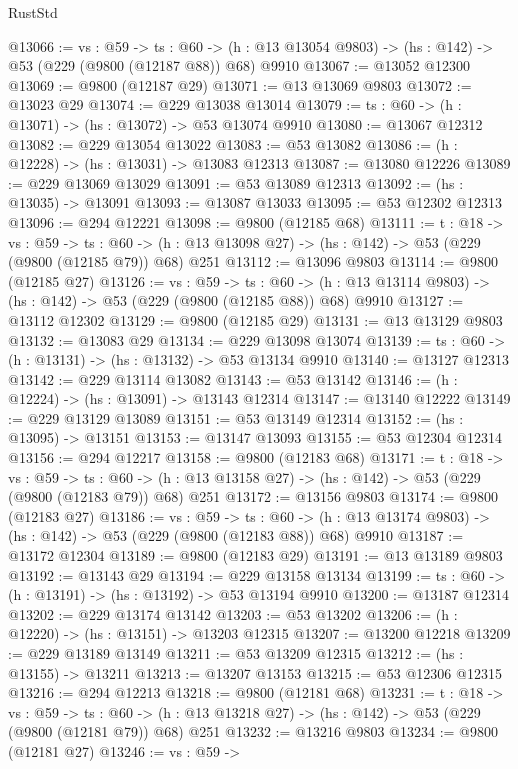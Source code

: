 \begin{lexlean}{RustStd}
\begin{coremodule}
@13066 := {vs : @59} ->
  {ts : @60} -> (h : @13 @13054 @9803) -> (hs : @142) -> @53 (@229 (@9800 (@12187 @88)) @68) @9910
@13067 := @13052 @12300
@13069 := @9800 (@12187 @29)
@13071 := @13 @13069 @9803
@13072 := @13023 @29
@13074 := @229 @13038 @13014
@13079 := {ts : @60} -> (h : @13071) -> (hs : @13072) -> @53 @13074 @9910
@13080 := @13067 @12312
@13082 := @229 @13054 @13022
@13083 := @53 @13082
@13086 := (h : @12228) -> (hs : @13031) -> @13083 @12313
@13087 := @13080 @12226
@13089 := @229 @13069 @13029
@13091 := @53 @13089 @12313
@13092 := (hs : @13035) -> @13091
@13093 := @13087 @13033
@13095 := @53 @12302 @12313
@13096 := @294 @12221
@13098 := @9800 (@12185 @68)
@13111 := {t : @18} ->
  {vs : @59} ->
  {ts : @60} -> (h : @13 @13098 @27) -> (hs : @142) -> @53 (@229 (@9800 (@12185 @79)) @68) @251
@13112 := @13096 @9803
@13114 := @9800 (@12185 @27)
@13126 := {vs : @59} ->
  {ts : @60} -> (h : @13 @13114 @9803) -> (hs : @142) -> @53 (@229 (@9800 (@12185 @88)) @68) @9910
@13127 := @13112 @12302
@13129 := @9800 (@12185 @29)
@13131 := @13 @13129 @9803
@13132 := @13083 @29
@13134 := @229 @13098 @13074
@13139 := {ts : @60} -> (h : @13131) -> (hs : @13132) -> @53 @13134 @9910
@13140 := @13127 @12313
@13142 := @229 @13114 @13082
@13143 := @53 @13142
@13146 := (h : @12224) -> (hs : @13091) -> @13143 @12314
@13147 := @13140 @12222
@13149 := @229 @13129 @13089
@13151 := @53 @13149 @12314
@13152 := (hs : @13095) -> @13151
@13153 := @13147 @13093
@13155 := @53 @12304 @12314
@13156 := @294 @12217
@13158 := @9800 (@12183 @68)
@13171 := {t : @18} ->
  {vs : @59} ->
  {ts : @60} -> (h : @13 @13158 @27) -> (hs : @142) -> @53 (@229 (@9800 (@12183 @79)) @68) @251
@13172 := @13156 @9803
@13174 := @9800 (@12183 @27)
@13186 := {vs : @59} ->
  {ts : @60} -> (h : @13 @13174 @9803) -> (hs : @142) -> @53 (@229 (@9800 (@12183 @88)) @68) @9910
@13187 := @13172 @12304
@13189 := @9800 (@12183 @29)
@13191 := @13 @13189 @9803
@13192 := @13143 @29
@13194 := @229 @13158 @13134
@13199 := {ts : @60} -> (h : @13191) -> (hs : @13192) -> @53 @13194 @9910
@13200 := @13187 @12314
@13202 := @229 @13174 @13142
@13203 := @53 @13202
@13206 := (h : @12220) -> (hs : @13151) -> @13203 @12315
@13207 := @13200 @12218
@13209 := @229 @13189 @13149
@13211 := @53 @13209 @12315
@13212 := (hs : @13155) -> @13211
@13213 := @13207 @13153
@13215 := @53 @12306 @12315
@13216 := @294 @12213
@13218 := @9800 (@12181 @68)
@13231 := {t : @18} ->
  {vs : @59} ->
  {ts : @60} -> (h : @13 @13218 @27) -> (hs : @142) -> @53 (@229 (@9800 (@12181 @79)) @68) @251
@13232 := @13216 @9803
@13234 := @9800 (@12181 @27)
@13246 := {vs : @59} ->

\end{coremodule}
\end{lexlean}
